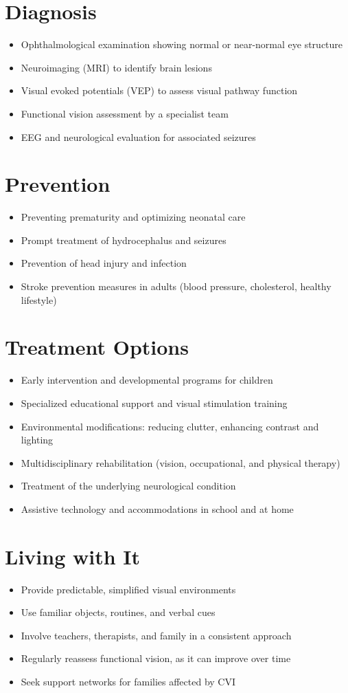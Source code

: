 \section{Diagnosis}
\begin{itemize}[noitemsep]
  \item Ophthalmological examination showing normal or near-normal eye structure
  \item Neuroimaging (MRI) to identify brain lesions
  \item Visual evoked potentials (VEP) to assess visual pathway function
  \item Functional vision assessment by a specialist team
  \item EEG and neurological evaluation for associated seizures
\end{itemize}
\section{Prevention}
\begin{itemize}[noitemsep]
  \item Preventing prematurity and optimizing neonatal care
  \item Prompt treatment of hydrocephalus and seizures
  \item Prevention of head injury and infection
  \item Stroke prevention measures in adults (blood pressure, cholesterol, healthy lifestyle)
\end{itemize}
\section{Treatment Options}
\begin{itemize}[noitemsep]
  \item Early intervention and developmental programs for children
  \item Specialized educational support and visual stimulation training
  \item Environmental modifications: reducing clutter, enhancing contrast and lighting
  \item Multidisciplinary rehabilitation (vision, occupational, and physical therapy)
  \item Treatment of the underlying neurological condition
  \item Assistive technology and accommodations in school and at home
\end{itemize}
\section{Living with It}
\begin{itemize}[noitemsep]
  \item Provide predictable, simplified visual environments
  \item Use familiar objects, routines, and verbal cues
  \item Involve teachers, therapists, and family in a consistent approach
  \item Regularly reassess functional vision, as it can improve over time
  \item Seek support networks for families affected by CVI
\end{itemize}
